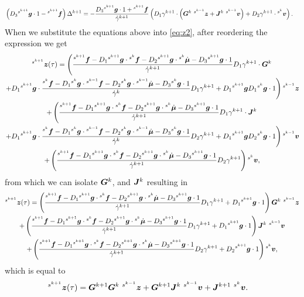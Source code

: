 \documentclass[../DC2019003Bouma.tex]{subfiles}
\begin{document}
\begin{align}
&\left(D_3\ls^{s^{k+1}}\gb\cdot 1 - \ls^{s^{k+1}}\fb\right)\Delta^{k+1} = -\frac{D_3\ls^{s^{k+1}}\gb\cdot 1+\ls^{s^{k+1}}\fb}{\dot{\gamma}^{k+1}}\left(D_1\gamma^{k+1}\cdot\left(\Gb^{k}\ \ls^{s^{k-1}}\zb + \Jb^{k}\ \ls^{s^{k-1}}\vb\right) + D_2\gamma^{k+1}\cdot\ls^{s^{k}}\vb\right).
\end{align}
When we substitute the equations above into \eqref{eq:z2}, after reordering the expression we get
\begin{multline}
\ls^{s^{k+1}}\zb(\tau) = \left(\frac{\ls^{s^{k+1}}\fb - D_1\ls^{s^{k+1}}\gb\cdot\ls^{s^{k}}\fb - D_2\ls^{s^{k+1}}\gb\cdot\ls^{s^{k}}\dot{\mub} - D_3\ls^{s^{k+1}}\gb\cdot 1}{\dot{\gamma}^{k+1}}D_1\gamma^{k+1}\cdot\Gb^{k}\right.\\
\left. + D_1\ls^{s^{k+1}}\gb\cdot\frac{\ls^{s^{k}}\fb - D_1\ls^{s^{k}}\gb\cdot\ls^{s^{k-1}}\fb - D_2\ls^{s^{k}}\gb\cdot\ls^{s^{k-1}}\dot{\mub} - D_3\ls^{s^{k}}\gb\cdot 1}{\dot{\gamma}^{k}}D_1\gamma^{k+1} + D_1\ls^{s^{k+1}}\gb D_1\ls^{s^{k}}\gb\cdot 1\right)\ls^{s^{k-1}}\zb\\
+ \left(\frac{\ls^{s^{k+1}}\fb-D_1\ls^{s^{k+1}}\gb\cdot\ls^{s^{k}}\fb -D_2\ls^{s^{k+1}}\gb\cdot\ls^{s^{k}}\dot{\mub} - D_3\ls^{s^{k+1}}\gb\cdot 1}{\dot{\gamma}^{k+1}}D_1\gamma^{k+1}\cdot\Jb^{k}\right.\\
\left. + D_1\ls^{s^{k+1}}\gb\cdot\frac{\ls^{s^{k}}\fb-D_1\ls^{s^{k}}\gb\cdot\ls^{s^{k-1}}\fb-D_2\ls^{s^{k}}\gb\cdot\ls^{s^{k-1}}\dot{\mub}-D_3\ls^{s^{k}}\gb\cdot 1}{\dot{\gamma}^{k}}D_2\gamma^{k+1} + D_1\ls^{s^{k+1}}\gb D_2\ls^{s^{k}}\gb\cdot 1 \right)\ls^{s^{k-1}}\vb\\
+ \left(\frac{\ls^{s^{k+1}}\fb-D_1\ls^{s^{k+1}}\gb\cdot\ls^{s^{k}}\fb - D_2\ls^{s^{k+1}}\gb\cdot\ls^{s^{k}}\dot{\mub} - D_3\ls^{s^{k+1}}\gb\cdot 1}{\dot{\gamma}^{k+1}}D_2\gamma^{k+1}\right)\ls^{s^{k}}\vb,
\end{multline}
from which we can isolate $\Gb^{k}$, and $\Jb^{k}$ resulting in
\begin{multline}
\ls^{s^{k+1}}\zb(\tau) = \left(\frac{\ls^{s^{k+1}}\fb - D_1\ls^{s^{k+1}}\gb\cdot\ls^{s^{k}}\fb  - D_2\ls^{s^{k+1}}\gb\cdot\ls^{s^{k}}\dot{\mub} - D_3\ls^{s^{k+1}}\gb\cdot 1}{\dot{\gamma}^{k+1}}D_1\gamma^{k+1} + D_1\ls^{s^{k+1}}\gb\cdot 1\right)\Gb^{k}\ \ls^{s^{k-1}}\zb\\
+ \left(\frac{\ls^{s^{k+1}}\fb - D_1\ls^{s^{k+1}}\gb\cdot\ls^{s^{k}}\fb - D_2\ls^{s^{k+1}}\gb\cdot\ls^{s^{k}}\dot{\mub} - D_3\ls^{s^{k+1}}\gb\cdot 1}{\dot{\gamma}^{k+1}}D_1\gamma^{k+1} + D_1\ls^{s^{k+1}}\gb\cdot 1\right)\Jb^{k}\ \ls^{s^{k-1}}\vb \\
+ \left(\frac{\ls^{s^{k+1}}\fb-D_1\ls^{s^{k+1}}\gb\cdot\ls^{s^{k}}\fb - D_2\ls^{s^{k+1}}\gb\cdot\ls^{s^{k}}\dot{\mub} - D_3\ls^{s^{k+1}}\gb\cdot 1}{\dot{\gamma}^{k+1}}D_2\gamma^{k+1} + D_2\ls^{s^{k+1}}\gb\cdot 1\right)\ls^{s^{k}}\vb,
\end{multline}
which is equal to
\begin{align}
&\ls^{s^{k+1}}\zb(\tau) = \Gb^{k+1}\Gb^k\ \ls^{s^{k-1}}\zb + \Gb^{k+1}\Jb^k\ \ls^{s^{k-1}}\vb + \Jb^{k+1}\ \ls^{s^{k}}\vb.\label{eq:zkplusfinal}
\end{align}
\end{document}
